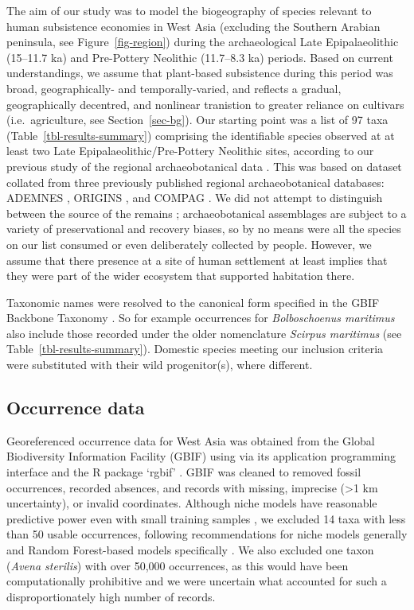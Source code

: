 \documentclass[
  authoryear,
  preprint]{elsarticle}
\begin{document}
The aim of our study was to model the biogeography of species relevant
to human subsistence economies in West Asia (excluding the Southern
Arabian peninsula, see Figure~\ref{fig-region}) during the
archaeological Late Epipalaeolithic (15--11.7 ka) and Pre-Pottery
Neolithic (11.7--8.3 ka) periods. Based on current understandings, we
assume that plant-based subsistence during this period was broad,
geographically- and temporally-varied, and reflects a gradual,
geographically decentred, and nonlinear tranistion to greater reliance
on cultivars (i.e.~agriculture, see Section~\ref{sec-bg}). Our starting
point was a list of 97 taxa (Table~\ref{tbl-results-summary}) comprising
the identifiable species observed at at least two Late
Epipalaeolithic/Pre-Pottery Neolithic sites, according to our previous
study of the regional archaeobotanical data
\citep{ArranzOtaeguiRoe2023}. This was based on dataset collated from
three previously published regional archaeobotanical databases: ADEMNES
\citep{ADEMNES}, ORIGINS \citep{ORIGINS}, and COMPAG
\citetext{\citealp{LucasFuller2018}; \citealp{FullerEtAl2018}; \citealp[based
on][]{ColledgeEtAl2004}; \citealp{ShennanConolly2007}}. We did not
attempt to distinguish between the source of the remains
\citep[cf.][]{WallaceEtAl2018}; archaeobotanical assemblages are subject
to a variety of preservational and recovery biases, so by no means were
all the species on our list consumed or even deliberately collected by
people. However, we assume that there presence at a site of human
settlement at least implies that they were part of the wider ecosystem
that supported habitation there.

Taxonomic names were resolved to the canonical form specified in the
GBIF Backbone Taxonomy \citep{GBIFSecretariat2023}. So for example
occurrences for \emph{Bolboschoenus maritimus} also include those
recorded under the older nomenclature \emph{Scirpus maritimus} (see
Table~\ref{tbl-results-summary}). Domestic species meeting our inclusion
criteria were substituted with their wild progenitor(s), where
different.

\subsection{Occurrence data}\label{occurrence-data}

Georeferenced occurrence data for West Asia was obtained from the Global
Biodiversity Information Facility (GBIF) using via its application
programming interface and the R package `rgbif'
\citep{ChamberlainBoettiger2017, rgbif}. GBIF was cleaned to removed
fossil occurrences, recorded absences, and records with missing,
imprecise (\textgreater1 km uncertainty), or invalid coordinates.
Although niche models have reasonable predictive power even with small
training samples
\citep{StockwellPeterson2002, HernandezEtAl2006, WiszEtAl2008}, we
excluded 14 taxa with less than 50 usable occurrences, following
recommendations for niche models generally and Random Forest-based
models specifically \citep{StockwellPeterson2002, LuanEtAl2020}. We also
excluded one taxon (\emph{Avena sterilis}) with over 50,000 occurrences,
as this would have been computationally prohibitive and we were
uncertain what accounted for such a disproportionately high number of
records.
\end{document}
